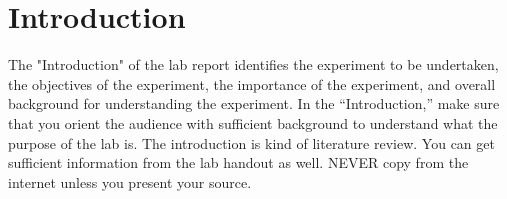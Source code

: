 \section{Introduction}
\tab The "Introduction" of the lab report identifies the experiment to be undertaken, the objectives of the experiment, the importance of the experiment, and overall background for understanding the experiment. In the “Introduction,” make sure that you orient the audience with sufficient background to understand what the purpose of the lab is. The introduction is kind of literature review. You can get sufficient information from the lab handout as well. NEVER copy from the internet unless you present your source.
